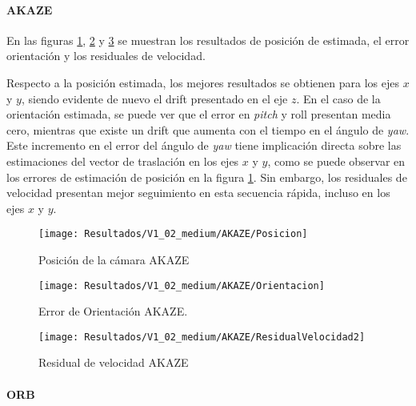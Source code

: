 \paragraph {AKAZE}

En las figuras \ref{imagen:Resultados/V1_02_medium/AKAZE/Posicion}, \ref{imagen:Resultados/V1_02_medium/AKAZE/Orientacion} y \ref{imagen:Resultados/V1_02_medium/AKAZE/ResidualVelocidad} se muestran los resultados de posición de estimada, el error orientación y los residuales de velocidad.

Respecto a la posición estimada, los mejores resultados se obtienen para los ejes $x$ y $y$, siendo evidente de nuevo el drift presentado en el eje $z$. En el caso de la orientación estimada, se puede ver que el error en \textit{pitch} y roll presentan media cero, mientras que existe un drift que aumenta con el tiempo en el ángulo de \textit{yaw}. Este incremento en el error del ángulo de \textit{yaw} tiene implicación directa sobre las estimaciones del vector de traslación en los ejes $x$ y $y$, como se puede observar en los errores de estimación de posición en la figura \ref{imagen:Resultados/V1_02_medium/AKAZE/Posicion}. Sin embargo, los residuales de velocidad presentan mejor seguimiento en esta secuencia rápida, incluso en los ejes $x$ y $y$.
	
	
\begin{figure}[H]
	\centering
	\texttt{[image: Resultados/V1\_02\_medium/AKAZE/Posicion]}
	\caption{Posición de la cámara AKAZE}
	\label{imagen:Resultados/V1_02_medium/AKAZE/Posicion}
\end{figure}


\begin{figure}[H]
	\centering
	\texttt{[image: Resultados/V1\_02\_medium/AKAZE/Orientacion]}
	\caption[Error de Orientación AKAZE]{Error de Orientación AKAZE.}
	\label{imagen:Resultados/V1_02_medium/AKAZE/Orientacion}
\end{figure}



\begin{figure}[H]
	\centering
	\texttt{[image: Resultados/V1\_02\_medium/AKAZE/ResidualVelocidad2]}
	\caption{Residual de velocidad AKAZE}
	\label{imagen:Resultados/V1_02_medium/AKAZE/ResidualVelocidad}
\end{figure}

\paragraph {ORB}


